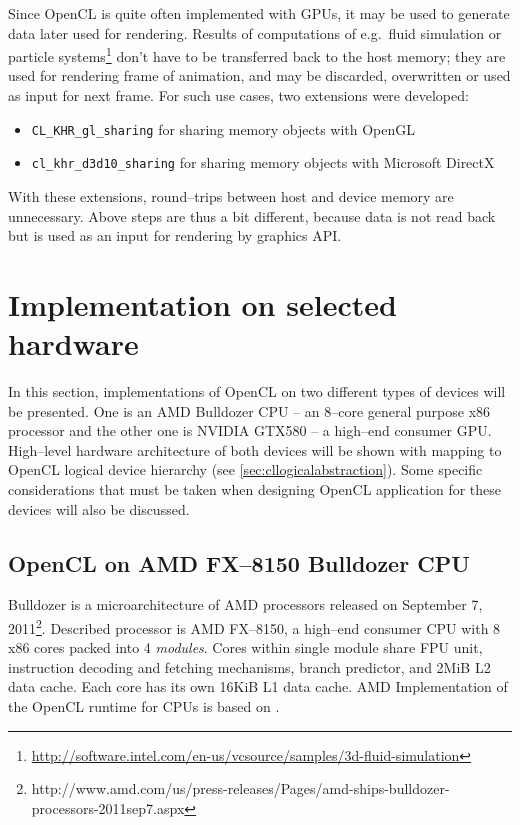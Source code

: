 Since OpenCL is quite often implemented with GPUs, it may be used to generate
data later used for rendering. Results of computations of e.g.~fluid simulation
\parencite{Kolb} or particle systems\footnote{\url{http://software.intel.com/en-us/vcsource/samples/3d-fluid-simulation}}
don't have to be transferred back to the host memory; they are used for
rendering frame of animation, and may be discarded, overwritten or used as input
for next frame. For such use cases, two extensions were developed:
\begin{itemize}
  \item \texttt{CL\_KHR\_gl\_sharing} for sharing memory objects with OpenGL
  \item \texttt{cl\_khr\_d3d10\_sharing} for sharing memory objects with Microsoft DirectX
\end{itemize}
With these extensions, round--trips between host and device memory are
unnecessary. Above steps are thus a bit different, because data is not read back
but is used as an input for rendering by graphics API.

\section{Implementation on selected hardware}
\label{sec:climpl}
In this section, implementations of OpenCL on two different types of devices
will be presented. One is an AMD Bulldozer CPU -- an 8--core general purpose x86
processor and the other one is NVIDIA GTX580 -- a high--end consumer GPU. High--level hardware
architecture of both devices will be shown with mapping to OpenCL logical
device hierarchy (see \autoref{sec:cllogicalabstraction}). Some specific
considerations that must be taken when designing OpenCL application for these
devices will also be discussed.
\subsection{OpenCL on AMD FX--8150 Bulldozer CPU}

Bulldozer is a microarchitecture of AMD processors released on September 7, 2011\footnote{http://www.amd.com/us/press-releases/Pages/amd-ships-bulldozer-processors-2011sep7.aspx}.
Described processor is AMD FX--8150, a high--end consumer CPU with 8 x86 cores
packed into 4 \emph{modules}. Cores within single module share FPU unit,
instruction decoding and fetching mechanisms, branch predictor, and 2MiB L2 data
cache. Each core has its own 16KiB L1 data cache. AMD Implementation of the OpenCL
runtime for CPUs is based on \cite{gummaraju2010twin}.

